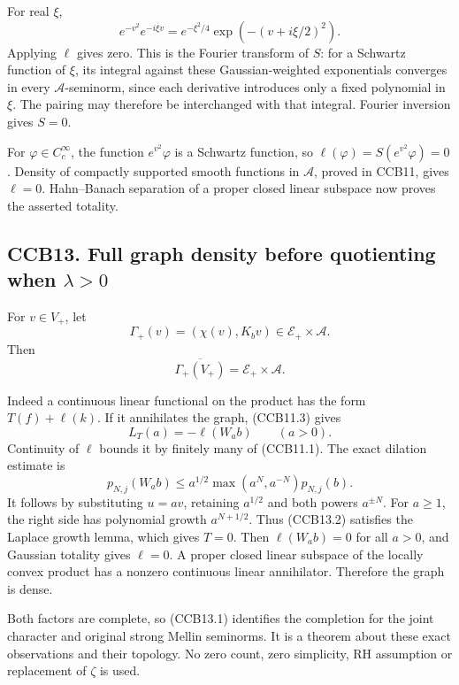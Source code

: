 For real \(\xi\), \[
e^{-v^2}e^{-i\xi v}
=e^{-\xi^2/4}\exp(-(v+i\xi/2)^2).
\] Applying \(\ell\) gives zero. This is the Fourier transform of \(S\):
for a Schwartz function of \(\xi\), its integral against these
Gaussian-weighted exponentials converges in every
\(\mathcal A\)-seminorm, since each derivative introduces only a fixed
polynomial in \(\xi\). The pairing may therefore be interchanged with
that integral. Fourier inversion gives \(S=0\).

For \(\varphi\in C_c^\infty\), the function \(e^{v^2}\varphi\) is a
Schwartz function, so \(\ell(\varphi)=S(e^{v^2}\varphi)=0\). Density of
compactly supported smooth functions in \(\mathcal A\), proved in CCB11,
gives \(\ell=0\). Hahn--Banach separation of a proper closed linear
subspace now proves the asserted totality.

\subsection{\texorpdfstring{CCB13. Full graph density before quotienting
when
\(\lambda>0\)}{CCB13. Full graph density before quotienting when \textbackslash lambda\textgreater0}}\label{ccb13.-full-graph-density-before-quotienting-when-lambda0}

For \(v\in V_+\), let \[
\Gamma_+(v)=(\chi(v),K_bv)\in\mathscr E_+\times\mathcal A.
\] Then \[
\boxed{\overline{\Gamma_+(V_+)}
=\mathscr E_+\times\mathcal A.}
\tag{CCB13.1}
\]

Indeed a continuous linear functional on the product has the form
\(T(f)+\ell(k)\). If it annihilates the graph, (CCB11.3) gives \[
L_T(a)=-\ell(W_a b)\qquad(a>0).
\tag{CCB13.2}
\] Continuity of \(\ell\) bounds it by finitely many of (CCB11.1). The
exact dilation estimate is \[
p_{N,j}(W_a b)
\le a^{1/2}\max(a^N,a^{-N})p_{N,j}(b).
\tag{CCB13.3}
\] It follows by substituting \(u=av\), retaining \(a^{1/2}\) and both
powers \(a^{\pm N}\). For \(a\ge1\), the right side has polynomial
growth \(a^{N+1/2}\). Thus (CCB13.2) satisfies the Laplace growth lemma,
which gives \(T=0\). Then \(\ell(W_a b)=0\) for all \(a>0\), and
Gaussian totality gives \(\ell=0\). A proper closed linear subspace of
the locally convex product has a nonzero continuous linear annihilator.
Therefore the graph is dense.

Both factors are complete, so (CCB13.1) identifies the completion for
the joint character and original strong Mellin seminorms. It is a
theorem about these exact observations and their topology. No zero
count, zero simplicity, RH assumption or replacement of \(\zeta\) is
used.

